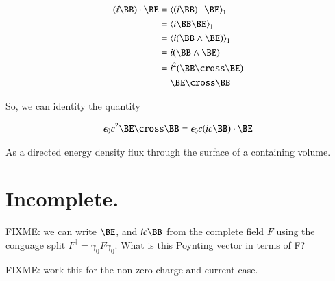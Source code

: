 \documentclass{article}
\begin{document}
\begin{align*}
(i \BB) \cdot \BE 
&= \gpgradeone{ (i \BB) \cdot \BE } \\
&= \gpgradeone{ i \BB \BE } \\
&= \gpgradeone{ i (\BB \wedge \BE) } \\
&= i (\BB \wedge \BE) \\
&= i^2(\BB \cross \BE) \\
&= \BE \cross \BB \\
\end{align*}

So, we can identity the quantity 

\begin{align*}
\epsilon_0 c^2 \BE \cross \BB = \epsilon_0 c (i c \BB) \cdot \BE 
\end{align*}

As a directed energy density flux through the surface of a containing volume.

\section{ Incomplete. }

FIXME: we can write $\BE$, and $i c \BB$ from the complete field $F$ using the conguage split $F^\dagger = \gamma_0 F \gamma_0$.  What
is this Poynting vector in terms of F?

FIXME: work this for the non-zero charge and current case.



\end{document}
